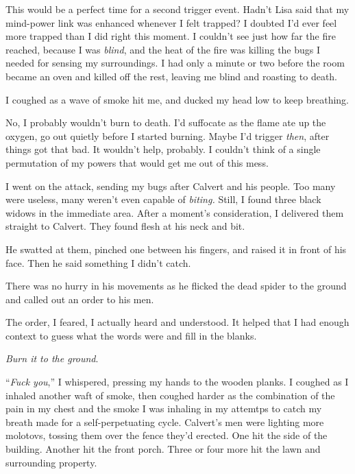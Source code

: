 This would be a perfect time for a second trigger event.  Hadn't Lisa said that my mind-power link was enhanced whenever I felt trapped?  I doubted I'd ever feel more trapped than I did right this moment.  I couldn't see just how far the fire reached, because I was \emph{blind}, and the heat of the fire was killing the bugs I needed for sensing my surroundings.  I had only a minute or two before the room became an oven and killed off the rest, leaving me blind and roasting to death.



I coughed as a wave of smoke hit me, and ducked my head low to keep breathing.



No, I probably wouldn't burn to death.  I'd suffocate as the flame ate up the oxygen, go out quietly before I started burning.  Maybe I'd trigger \emph{then}, after things got that bad.  It wouldn't help, probably.  I couldn't think of a single permutation of my powers that would get me out of this mess.



I went on the attack, sending my bugs after Calvert and his people.  Too many were useless, many weren't even capable of \emph{biting.  }Still,\emph{  }I found three black widows in the immediate area.  After a moment's consideration, I delivered them straight to Calvert.  They found flesh at his neck and bit.



He swatted at them, pinched one between his fingers, and raised it in front of his face.  Then he said something I didn't catch.



There was no hurry in his movements as he flicked the dead spider to the ground and called out an order to his men.



The order, I feared, I actually heard and understood.  It helped that I had enough context to guess what the words were and fill in the blanks.



\emph{Burn it to the ground}.



``\emph{Fuck you},'' I whispered, pressing my hands to the wooden planks.  I coughed as I inhaled another waft of smoke, then coughed harder as the combination of the pain in my chest and the smoke I was inhaling in my attemtps to catch my breath made for a self-perpetuating cycle.  Calvert's men were lighting more molotovs, tossing them over the fence they'd erected.  One hit the side of the building.  Another hit the front porch.  Three or four more hit the lawn and surrounding property.



